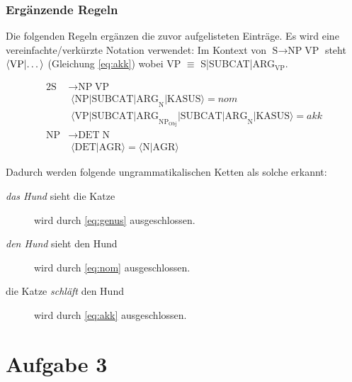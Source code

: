 \documentclass[a4paper]{sprach}
\newcommand{\cat}[1]{\text{#1}}
\newcommand{\kgr}[1]{\langle #1 \rangle}
\begin{document}
\subsubsection*{Ergänzende Regeln}

Die folgenden Regeln ergänzen die zuvor aufgelisteten Einträge. Es wird eine vereinfachte/verkürzte Notation
verwendet: Im Kontext von $\cat{S} \rightarrow \cat{NP}\;\cat{VP}$ steht
$\kgr{\text{VP|\dots}}$ (Gleichung \ref{eq:akk}) wobei VP $\equiv$ S|SUBCAT|ARG$_\text{VP}$.

\begin{alignat}{2}
\cat{S} &\rightarrow \cat{NP}\;\cat{VP}\\ 
  &\; \kgr{\text{NP|SUBCAT|ARG}_\text{N}\text{|KASUS}} = nom\label{eq:nom}\\
  &\; \kgr{\text{VP|SUBCAT|ARG}_{\text{NP}_\text{Obj}}\text{|SUBCAT|ARG}_\text{N}|\text{KASUS}} = akk\label{eq:akk}\\
\cat{NP} &\rightarrow \cat{DET}\;\cat{N}\\
  &\; \kgr{\text{DET|AGR}} = \kgr{\text{N|AGR}}\label{eq:genus}
\end{alignat}

Dadurch werden folgende ungrammatikalischen Ketten als solche erkannt:

\begin{description}
  \item [\textit{das Hund} sieht die Katze] wird durch \ref{eq:genus} ausgeschlossen.
  \item [\textit{den Hund} sieht den Hund] wird durch \ref{eq:nom} ausgeschlossen.
  \item [die Katze \textit{schläft} den Hund] wird durch \ref{eq:akk} ausgeschlossen.
\end{description}


\section*{Aufgabe 3}
\end{document}
